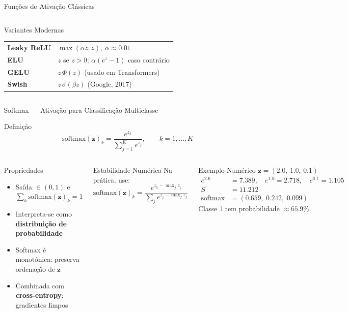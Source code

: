 \documentclass[7pt, aspectratio=169,10pt]{beamer}
\newcommand{\bz}{\bm{z}}
\begin{document}
\begin{frame}{Funções de Ativação Clássicas}
\begin{columns}[T]
\begin{block}{Variantes Modernas}
\small
\begin{tabular}{ll}
\textbf{Leaky ReLU} & $\max(\alpha z, z),\ \alpha\!\approx\!0.01$ \\
\textbf{ELU} & $z$ se $z>0$; $\alpha(e^z-1)$ caso contrário \\
\textbf{GELU} & $z\,\Phi(z)$ (usado em Transformers) \\
\textbf{Swish} & $z\,\sigma(\beta z)$ (Google, 2017) \\
\end{tabular}
\end{block}

\end{columns}
\end{frame}

\begin{frame}{Softmax — Ativação para Classificação Multiclasse}
\begin{block}{Definição}
\[
  \text{softmax}(\bz)_k = \frac{e^{z_k}}{\sum_{j=1}^{K} e^{z_j}}, \qquad k=1,\ldots,K
\]
\end{block}
\begin{columns}[T]
\begin{exampleblock}{Propriedades}
\small
\begin{itemize}
  \item Saída $\in (0,1)$ e $\sum_k \text{softmax}(\bz)_k = 1$
  \item Interpreta-se como \textbf{distribuição de probabilidade}
  \item Softmax é monotônica: preserva ordenação de $\bz$
  \item Combinada com \textbf{cross-entropy}: gradientes limpos
\end{itemize}
\end{exampleblock}
\begin{alertblock}{Estabilidade Numérica}
\small
Na prática, use:
$\text{softmax}(\bz)_k = \dfrac{e^{z_k - \max_j z_j}}{\sum_j e^{z_j-\max_j z_j}}$
\end{alertblock}
\begin{exampleblock}{Exemplo Numérico}
\small
$\bz = (2.0,\ 1.0,\ 0.1)$
\begin{align*}
e^{2.0} &= 7.389,\quad e^{1.0}=2.718,\quad e^{0.1}=1.105\\
S &= 11.212\\
\text{softmax} &= (0.659,\; 0.242,\; 0.099)
\end{align*}
Classe 1 tem probabilidade $\approx 65.9\%$.
\end{exampleblock}
\end{columns}
\end{frame}
\end{document}
